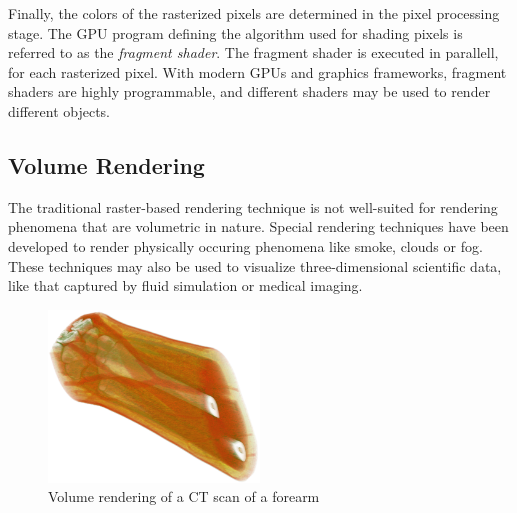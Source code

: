 \documentclass{article}
\begin{document}
Finally, the colors of the rasterized pixels are determined in the pixel processing stage.
The GPU program defining the algorithm used for shading pixels is referred to as the \textit{fragment shader}.
The fragment shader is executed in parallell, for each rasterized pixel. With modern GPUs and graphics frameworks, fragment shaders are highly programmable, and different shaders may be used to render different objects.

\subsection{Volume Rendering}
The traditional raster-based rendering technique is not well-suited for rendering phenomena that are volumetric in nature.
Special rendering techniques have been developed to render physically occuring phenomena like smoke, clouds or fog. These techniques
may also be used to visualize three-dimensional scientific data, like that captured by fluid simulation or medical imaging.

\begin{figure}[tbh]
    \centering
    \includegraphics[width=0.5\textwidth]{images/VolumeRendering.png}
    \caption{Volume rendering of a CT scan of a forearm}
    \label{fig:forearmCT}
\end{figure}
\end{document}
